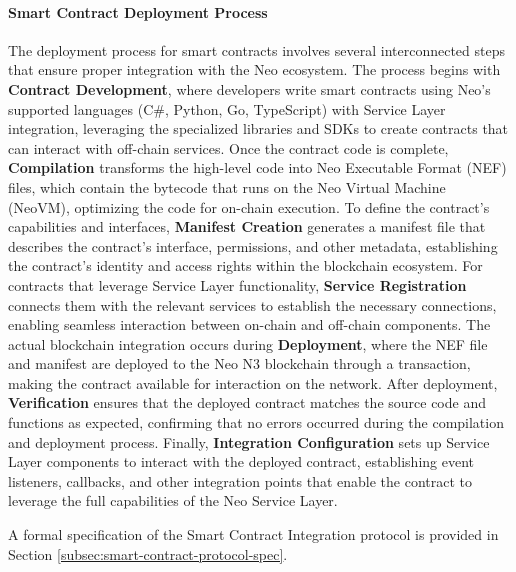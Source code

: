 \documentclass[11pt]{article}
\begin{document}
\paragraph{Smart Contract Deployment Process}
The deployment process for smart contracts involves several interconnected steps that ensure proper integration with the Neo ecosystem. The process begins with \textbf{Contract Development}, where developers write smart contracts using Neo's supported languages (C\#, Python, Go, TypeScript) with Service Layer integration, leveraging the specialized libraries and SDKs to create contracts that can interact with off-chain services. Once the contract code is complete, \textbf{Compilation} transforms the high-level code into Neo Executable Format (NEF) files, which contain the bytecode that runs on the Neo Virtual Machine (NeoVM), optimizing the code for on-chain execution. To define the contract's capabilities and interfaces, \textbf{Manifest Creation} generates a manifest file that describes the contract's interface, permissions, and other metadata, establishing the contract's identity and access rights within the blockchain ecosystem. For contracts that leverage Service Layer functionality, \textbf{Service Registration} connects them with the relevant services to establish the necessary connections, enabling seamless interaction between on-chain and off-chain components. The actual blockchain integration occurs during \textbf{Deployment}, where the NEF file and manifest are deployed to the Neo N3 blockchain through a transaction, making the contract available for interaction on the network. After deployment, \textbf{Verification} ensures that the deployed contract matches the source code and functions as expected, confirming that no errors occurred during the compilation and deployment process. Finally, \textbf{Integration Configuration} sets up Service Layer components to interact with the deployed contract, establishing event listeners, callbacks, and other integration points that enable the contract to leverage the full capabilities of the Neo Service Layer.

A formal specification of the Smart Contract Integration protocol is provided in Section \ref{subsec:smart-contract-protocol-spec}.


\end{document}

